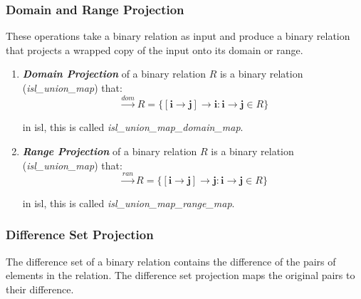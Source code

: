 \subsubsection{Domain and Range Projection}

These operations take a binary relation as input and produce a binary relation that projects a wrapped copy of the input onto its domain or range.

\begin{enumerate}
  \item \textcolor{vr}{\textbf{\emph{Domain Projection}}} of a binary relation $R$ is a binary relation (\textcolor{pg}{\emph{isl\_union\_map}}) that:
  $$\xrightarrow{dom} R = \{ [\mathbf{i} \rightarrow \mathbf{j}] \rightarrow \mathbf{i}:
  \mathbf{i} \rightarrow \mathbf{j} \in R\}$$

  in isl, this is called \emph{isl\_union\_map\_domain\_map}.

  \item \textcolor{vr}{\textbf{\emph{Range Projection}}} of a binary relation $R$ is a binary relation (\textcolor{pg}{\emph{isl\_union\_map}}) that:
  $$\xrightarrow{ran} R = \{ [\mathbf{i} \rightarrow \mathbf{j}] \rightarrow \mathbf{j}:
  \mathbf{i} \rightarrow \mathbf{j} \in R\}$$

  in isl, this is called \emph{isl\_union\_map\_range\_map}.
\end{enumerate}

\subsubsection{Difference Set Projection}

The difference set of a binary relation contains the difference of the pairs of elements in the relation. The difference set projection maps the original pairs to their difference.


